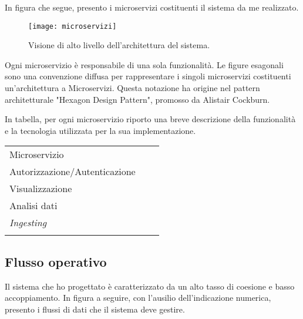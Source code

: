 In figura che segue, presento i microservizi costituenti il sistema 
da me realizzato.
\newpage
\begin{figure}[htbp]
	\begin{center}
		\texttt{[image: microservizi]}
		\caption{Visione di alto livello dell'architettura del sistema.}
	\end{center}
\end{figure}  

Ogni microservizio è responsabile di una sola funzionalità. 
Le figure esagonali sono una convenzione diffusa per 
rappresentare i singoli microservizi costituenti 
un'architettura a Microservizi. Questa notazione ha origine 
nel pattern architetturale "Hexagon Design Pattern", 
promosso da Alistair Cockburn.


In tabella, per ogni microservizio riporto
una breve descrizione della funzionalità e la tecnologia 
utilizzata per la sua implementazione.  

\begin{center}
	\begin{tabular}
		{l||p{5cm}||p{4cm}}	
		\arrayrulecolor{white}
		\rowcolor{glaucous}	
		Microservizio &  
		\makebox[5cm][c]{Funzionalità) } & 	
		\makebox[4cm][c]{Tecnologia} \\
		\rowcolor{lightcornflowerblue}
		Autorizzazione/Autenticazione & 
		\makebox[5cm][c]{Gestione degli accessi} & 
		\makebox[4cm][c]{Nginx}  \\
		\rowcolor{moonstoneblue}
		Visualizzazione & 
		\makebox[5cm][c]{Gestione delle dashboard} & 
		\makebox[4cm][c]{Kibana} \\
		\rowcolor{lightcornflowerblue}
		Analisi dati & 
		\makebox[5cm][c]{Gestione dei dati in analisi} & 
		\makebox[4cm][c]{Elasticsearch} \\
		\rowcolor{moonstoneblue}
		\textit{Ingesting} & 
		\makebox[5cm][c]{Raccolta ed inserimento dei dati} & 
		\makebox[4cm][c]{Logstash} \\ 
		\rowcolor{lightcornflowerblue}
	\end{tabular}		  
\end{center}

\subsection{Flusso operativo}
Il sistema che ho progettato è caratterizzato da un alto tasso di coesione e 
basso accoppiamento. In figura a seguire, con l'ausilio dell'indicazione
numerica, presento i flussi di dati che il sistema deve gestire.

